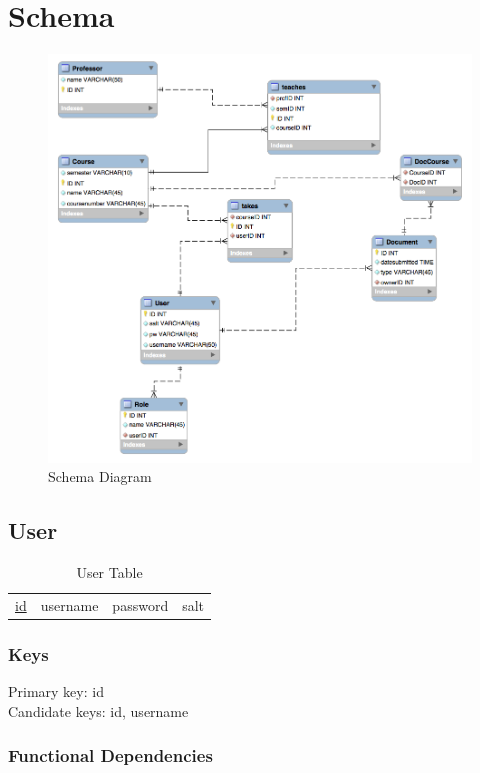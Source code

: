\documentclass[11pt]{article}
\begin{document}
\section{Schema}
\label{sec-3}


  \begin{figure}[htb]
  \centering
  \includegraphics[width=.9\linewidth]{Schema.png}
  \caption{Schema Diagram}
  \end{figure}
\subsection{User}
\label{sec-3-1}


\begin{table}[htb]
\caption{User Table} 
\begin{center}
\begin{tabular}{llll}
 \underline{id}  &  username  &  password  &  salt  \\
\end{tabular}
\end{center}
\end{table}
\subsubsection{Keys}
\label{sec-3-1-1}

    
    Primary key: id\\
    Candidate keys: id, username\\
\subsubsection{Functional Dependencies}
\label{sec-3-1-2}
\end{document}
